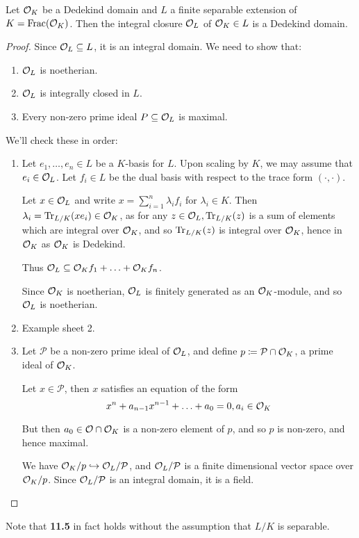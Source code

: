 \documentclass[10pt,a4paper]{article}
\begin{document}
\begin{theorem}
  Let $\mathcal{O}_K$ be a Dedekind domain and $L$ a finite separable extension of $K = \operatorname{Frac}(\mathcal{O}_K)$. Then the integral closure $\mathcal{O}_L$ of $\mathcal{O}_K \in L$ is a Dedekind domain.
\end{theorem}
\begin{proof}
  Since $\mathcal{O}_L \subseteq L$, it is an integral domain. We need to show that:
  \begin{enumerate}
    \item $\mathcal{O}_L$ is noetherian.
    \item $\mathcal{O}_L$ is integrally closed in $L$.
    \item Every non-zero prime ideal $P \subseteq \mathcal{O}_L$ is maximal.
  \end{enumerate}
  We'll check these in order:
  \begin{enumerate}
    \item Let $e_1, \ldots, e_n \in L$ be a $K$-basis for $L$. Upon scaling by $K$, we may assume that $e_i \in \mathcal{O}_L$. Let $f_i \in L$ be the dual basis with respect to the trace form $(\cdot, \cdot)$.

    Let $x \in \mathcal{O}_L$ and write $x = \sum_{i=1}^n \lambda_i f_i$ for $\lambda_i \in K$. Then $\lambda_i = \operatorname{Tr}_{L/K}(xe_i) \in \mathcal{O}_K$, as for any $z \in \mathcal{O}_L, \operatorname{Tr}_{L/K}(z)$ is a sum of elements which are integral over $\mathcal{O}_K$, and so $\operatorname{Tr}_{L/K}(z)$ is integral over $\mathcal{O}_K$, hence in $\mathcal{O}_K$ as $\mathcal{O}_K$ is Dedekind.

    Thus $\mathcal{O}_L \subseteq \mathcal{O}_K f_1 + \ldots + \mathcal{O}_K f_n$.

    Since $\mathcal{O}_K$ is noetherian, $\mathcal{O}_L$ is finitely generated as an $\mathcal{O}_K$-module, and so $\mathcal{O}_L$ is noetherian.
    \item Example sheet 2.
    \item Let $\mathcal{P}$ be a non-zero prime ideal of $\mathcal{O}_L$, and define $p \coloneqq \mathcal{P}\cap \mathcal{O}_K$, a prime ideal of $\mathcal{O}_K$.

    Let $x \in \mathcal{P}$, then $x$ satisfies an equation of the form
    \[x^n + a_{n-1}x^{n-1} + \ldots + a_0 = 0, a_i \in \mathcal{O}_K\]

    But then $a_0 \in \mathcal{O}\cap \mathcal{O}_K$ is a non-zero element of $p$, and so $p$ is non-zero, and hence maximal.

    We have $\mathcal{O}_K/p \hookrightarrow \mathcal{O}_L/\mathcal{P}$, and $\mathcal{O}_L/\mathcal{P}$ is a finite dimensional vector space over $\mathcal{O}_K/p$. Since $\mathcal{O}_L/\mathcal{P}$ is an integral domain, it is a field.
  \end{enumerate}
\end{proof}
Note that \textbf{11.5} in fact holds without the assumption that $L/K$ is separable.
\end{document}
